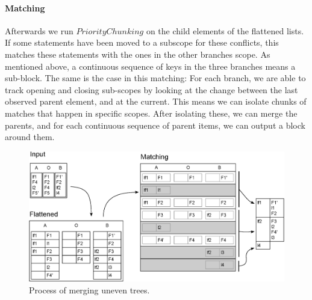 \documentclass[11pt]{article}
\begin{document}
\paragraph{Matching} Afterwards we run $PriorityChunking$ on the child elements of the flattened lists. If some statements have been moved to a subscope for these conflicts, this matches these statements with the ones in the other branches scope. As mentioned above, a continuous sequence of keys in the three branches means a sub-block. The same is the case in this matching: For each branch, we are able to track opening and closing sub-scopes by looking at the change between the last observed parent element, and at the current. This means we can isolate chunks of matches that happen in specific scopes. After isolating these, we can merge the parents, and for each continuous sequence of parent items, we can output a block around them.

\begin{figure}
   \centerline{\includegraphics[scale=0.55]{drawings/html/EditedFlattenedMerge.eps}}
   \caption{Process of merging uneven trees.}
   \label{UeventreeProcess}
\end{figure}
\end{document}
